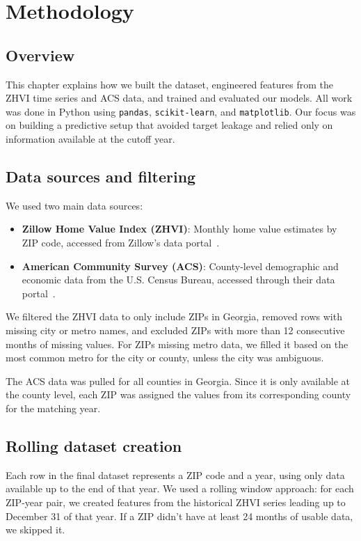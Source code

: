 \chapter{Methodology}
\label{ch:method}

\section{Overview}
This chapter explains how we built the dataset, engineered features from the ZHVI time series and ACS data, and trained and evaluated our models. All work was done in Python using \texttt{pandas}, \texttt{scikit-learn}, and \texttt{matplotlib}. Our focus was on building a predictive setup that avoided target leakage and relied only on information available at the cutoff year.

\section{Data sources and filtering}
We used two main data sources:

\begin{itemize}
    \item \textbf{Zillow Home Value Index (ZHVI)}: Monthly home value estimates by ZIP code, accessed from Zillow’s data portal~\cite{zillow_data}.
    
    \item \textbf{American Community Survey (ACS)}: County-level demographic and economic data from the U.S. Census Bureau, accessed through their data portal~\cite{acs_data}.
\end{itemize}

We filtered the ZHVI data to only include ZIPs in Georgia, removed rows with missing city or metro names, and excluded ZIPs with more than 12 consecutive months of missing values. For ZIPs missing metro data, we filled it based on the most common metro for the city or county, unless the city was ambiguous.

The ACS data was pulled for all counties in Georgia. Since it is only available at the county level, each ZIP was assigned the values from its corresponding county for the matching year.

\section{Rolling dataset creation}
Each row in the final dataset represents a ZIP code and a year, using only data available up to the end of that year. We used a rolling window approach: for each ZIP-year pair, we created features from the historical ZHVI series leading up to December 31 of that year. If a ZIP didn’t have at least 24 months of usable data, we skipped it.


